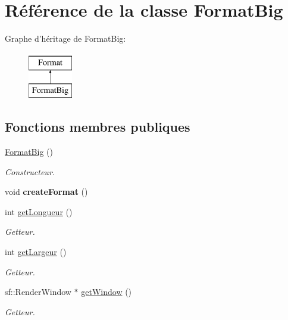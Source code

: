 \hypertarget{classFormatBig}{\section{Référence de la classe Format\+Big}
\label{classFormatBig}
}
Graphe d'héritage de Format\+Big\+:\begin{figure}[H]
\begin{center}
\leavevmode
\includegraphics[height=2.000000cm]{classFormatBig}
\end{center}
\end{figure}
\subsection*{Fonctions membres publiques}
\begin{DoxyCompactItemize}
\item 
\hypertarget{classFormatBig_a705324cfcf29ccce442adbd5b327b821}{\hyperlink{classFormatBig_a705324cfcf29ccce442adbd5b327b821}{Format\+Big} ()}\label{classFormatBig_a705324cfcf29ccce442adbd5b327b821}

\begin{DoxyCompactList}\small\item\em Constructeur. \end{DoxyCompactList}\item 
\hypertarget{classFormatBig_a1c0bbd51c2093997c75624682dba8772}{void {\bfseries create\+Format} ()}\label{classFormatBig_a1c0bbd51c2093997c75624682dba8772}

\item 
int \hyperlink{classFormatBig_ae244731f051e849ce816189283d452f4}{get\+Longueur} ()
\begin{DoxyCompactList}\small\item\em Getteur. \end{DoxyCompactList}\item 
int \hyperlink{classFormatBig_acf985751797a389460bf4b5271ffbad4}{get\+Largeur} ()
\begin{DoxyCompactList}\small\item\em Getteur. \end{DoxyCompactList}\item 
sf\+::\+Render\+Window $\ast$ \hyperlink{classFormatBig_a48f6f2efc1d7d40f7562b8f1430f36c7}{get\+Window} ()
\begin{DoxyCompactList}\small\item\em Getteur. \end{DoxyCompactList}\end{DoxyCompactItemize}


